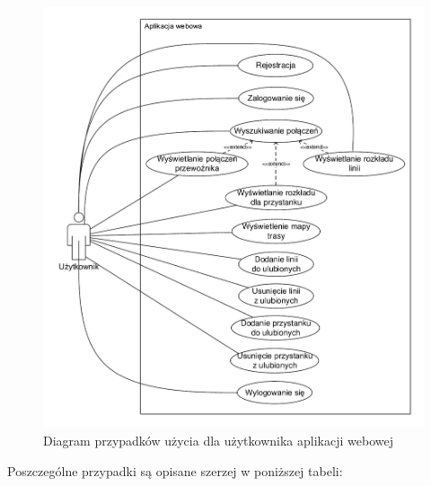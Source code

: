 \documentclass[10pt,a4paper]{article}
\begin{document}
\begin{figure}[H]
	\centering
	\includegraphics[width=12cm]{use-case-web.pdf}
	\caption{Diagram przypadków użycia dla użytkownika aplikacji webowej}
\end{figure}
Poszczególne przypadki są opisane szerzej w poniższej tabeli:
\end{document}
